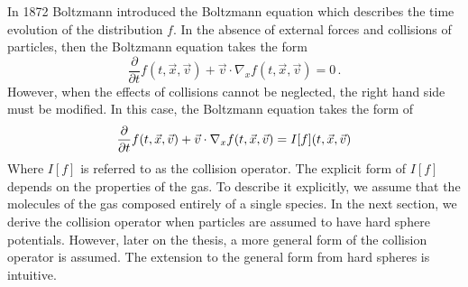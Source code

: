 \documentclass[12pt]{CSUNthesis}
\newcommand{\dydx}[2]{\frac{\partial{#1}}{\partial{#2}}}
\newcommand{\vecx}{\vec{x}}
\newcommand{\vecv}{\vec{v}}
\begin{document}
In 1872 Boltzmann \cite{Boltzmann1872} introduced the Boltzmann equation which describes the time evolution of the distribution $f$. In the absence of external forces and collisions of particles, then the Boltzmann equation takes the form
\begin{equation}
\label{eq:colless_boltzmann}
\dydx{}{t}f(t, \vecx, \vecv) + \vecv \cdot \nabla_x f(t, \vecx, \vecv) = 0\, .
\end{equation}
However, when the effects of collisions cannot be neglected, the right hand side must be modified. In this case, the Boltzmann equation takes the form of
\begin{equation}
\label{eq:boltzmann}
\dydx{}{t}f(t, \vecx, \vecv) + \vecv \cdot \nabla_x f(t, \vecx, \vecv) = I[f](t,\vecx,\vecv)\, \\ 
\end{equation}
Where $I[f]$ is referred to as the collision operator. The explicit form of $I[f]$ depends on the properties of the gas. To describe it explicitly, we assume that the molecules of the gas composed entirely of a single species. In the next section, we derive the collision operator when particles are assumed to have hard sphere potentials. However, later on the thesis, a more general form of the collision operator is assumed. The extension to the general form from hard spheres is intuitive.
	
\end{document}
